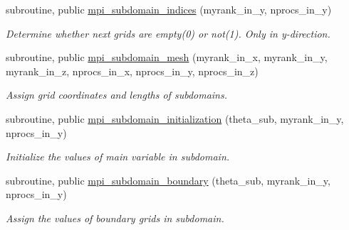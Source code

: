 \begin{DoxyCompactItemize}
subroutine, public \mbox{\hyperlink{namespacempi__subdomain_afe948dc18da021f2448cf9a6265155fe}{mpi\+\_\+subdomain\+\_\+indices}} (myrank\+\_\+in\+\_\+y, nprocs\+\_\+in\+\_\+y)
\begin{DoxyCompactList}\small\item\em Determine whether next grids are empty(0) or not(1). Only in y-\/direction. \end{DoxyCompactList}\item 
subroutine, public \mbox{\hyperlink{namespacempi__subdomain_a612331eead74041f174ece9a572c7427}{mpi\+\_\+subdomain\+\_\+mesh}} (myrank\+\_\+in\+\_\+x, myrank\+\_\+in\+\_\+y, myrank\+\_\+in\+\_\+z, nprocs\+\_\+in\+\_\+x, nprocs\+\_\+in\+\_\+y, nprocs\+\_\+in\+\_\+z)
\begin{DoxyCompactList}\small\item\em Assign grid coordinates and lengths of subdomains. \end{DoxyCompactList}\item 
subroutine, public \mbox{\hyperlink{namespacempi__subdomain_a7cc0deb85b84358eb7addeea849733c4}{mpi\+\_\+subdomain\+\_\+initialization}} (theta\+\_\+sub, myrank\+\_\+in\+\_\+y, nprocs\+\_\+in\+\_\+y)
\begin{DoxyCompactList}\small\item\em Initialize the values of main variable in subdomain. \end{DoxyCompactList}\item 
subroutine, public \mbox{\hyperlink{namespacempi__subdomain_a55659431068678c08d21847338390ea8}{mpi\+\_\+subdomain\+\_\+boundary}} (theta\+\_\+sub, myrank\+\_\+in\+\_\+y, nprocs\+\_\+in\+\_\+y)
\begin{DoxyCompactList}\small\item\em Assign the values of boundary grids in subdomain. \end{DoxyCompactList}\end{DoxyCompactItemize}
